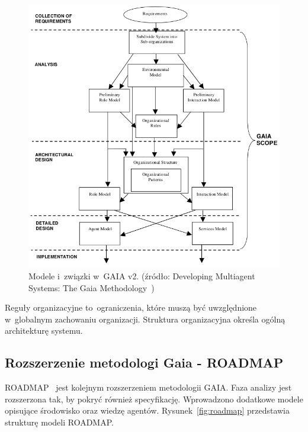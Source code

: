 \documentclass[11pt]{report}
\begin{document}
    \begin{figure}[!ht]
        \centering
        \includegraphics[width=\linewidth]{fig/gaia2 models.png}
        \caption{Modele i~związki w~GAIA v2. (źródło: Developing Multiagent Systems: The Gaia Methodology~\cite{Zambonelli2003})}
        \label{fig:gaia_v2}
    \end{figure}

    Reguły organizacyjne to~ograniczenia, które muszą być uwzględnione w~globalnym zachowaniu organizacji.
    Struktura organizacyjna określa ogólną architekturę systemu.

    \subsection{Rozszerzenie metodologi Gaia - ROADMAP}
    ROADMAP~\cite{Juan2002a} jest kolejnym rozszerzeniem metodologii GAIA\@.
    Faza analizy jest rozszerzona tak, by pokryć również specyfikację.
    Wprowadzono dodatkowe modele opisujące środowisko oraz wiedzę agentów.
    Rysunek~\ref{fig:roadmap} przedstawia strukturę modeli ROADMAP\@.
\end{document}
